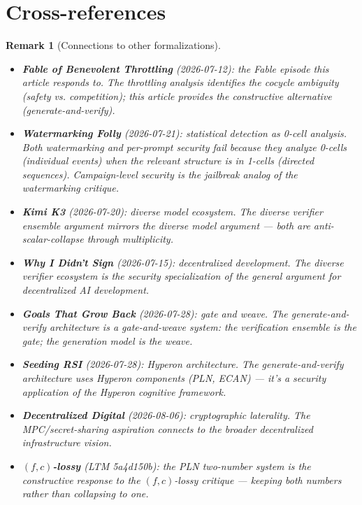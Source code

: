 \documentclass[11pt,a4paper]{article}
\newtheorem{remark}[definition]{Remark}
\begin{document}

\section{Cross-references}

\begin{remark}[Connections to other formalizations]
\begin{itemize}
\item \textbf{Fable of Benevolent Throttling} (2026-07-12): the
  Fable episode this article responds to. The throttling analysis
  identifies the cocycle ambiguity (safety vs. competition); this
  article provides the constructive alternative (generate-and-verify).
\item \textbf{Watermarking Folly} (2026-07-21): statistical detection
  as 0-cell analysis. Both watermarking and per-prompt security
  fail because they analyze 0-cells (individual events) when the
  relevant structure is in 1-cells (directed sequences). Campaign-level
  security is the jailbreak analog of the watermarking critique.
\item \textbf{Kimi K3} (2026-07-20): diverse model ecosystem. The
  diverse verifier ensemble argument mirrors the diverse model
  argument --- both are anti-scalar-collapse through multiplicity.
\item \textbf{Why I Didn't Sign} (2026-07-15): decentralized
  development. The diverse verifier ecosystem is the security
  specialization of the general argument for decentralized AI
  development.
\item \textbf{Goals That Grow Back} (2026-07-28): gate and weave.
  The generate-and-verify architecture is a gate-and-weave system:
  the verification ensemble is the gate; the generation model
  is the weave.
\item \textbf{Seeding RSI} (2026-07-28): Hyperon architecture. The
  generate-and-verify architecture uses Hyperon components (PLN,
  ECAN) --- it's a security application of the Hyperon cognitive
  framework.
\item \textbf{Decentralized Digital} (2026-08-06): cryptographic
  laterality. The MPC/secret-sharing aspiration connects to the
  broader decentralized infrastructure vision.
\item \textbf{$(f,c)$-lossy} (LTM 5a4d150b): the PLN two-number
  system is the constructive response to the $(f,c)$-lossy
  critique --- keeping both numbers rather than collapsing to one.
\end{itemize}
\end{remark}
\end{document}
